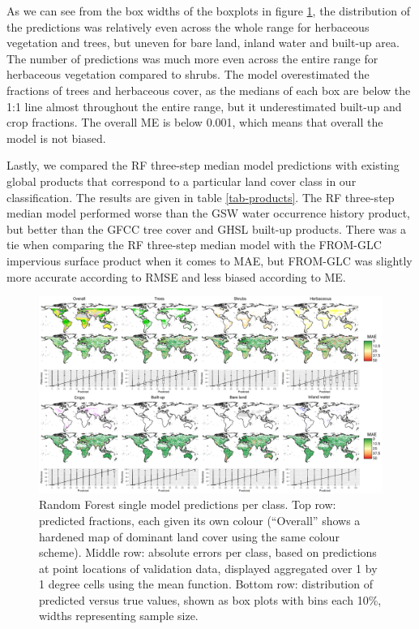 \documentclass[review,authoryear,3p]{elsarticle}
\begin{document}
As we can see from the box widths of the boxplots in figure \ref{fig-walltowall}, the distribution of the predictions was relatively even across the whole range for herbaceous vegetation and trees, but uneven for bare land, inland water and built-up area.
The number of predictions was much more even across the entire range for herbaceous vegetation compared to shrubs.
The model overestimated the fractions of trees and herbaceous cover, as the medians of each box are below the 1:1 line almost throughout the entire range, but it underestimated built-up and crop fractions.
The overall \gls{ME} is below 0.001, which means that overall the model is not biased.

Lastly, we compared the \gls{RF} three-step median model predictions with existing global products that correspond to a particular land cover class in our classification.
The results are given in table \ref{tab-products}.
The \gls{RF} three-step median model performed worse than the \gls{GSW} water occurrence history product, but better than the \gls{GFCC} tree cover and \gls{GHSL} built-up products.
There was a tie when comparing the \gls{RF} three-step median model with the \gls{FROM-GLC} impervious surface product when it comes to \gls{MAE}, but \gls{FROM-GLC} was slightly more accurate according to \gls{RMSE} and less biased according to \gls{ME}.

\begin{figure}
    \centering
    \includegraphics[width=\textwidth]{article-figures/maps/2020-10-12-walltowall.png}
    \caption{Random Forest single model predictions per class. Top row: predicted fractions, each given its own colour (``Overall'' shows a hardened map of dominant land cover using the same colour scheme). Middle row: absolute errors per class, based on predictions at point locations of validation data, displayed aggregated over 1 by 1 degree cells using the mean function. Bottom row: distribution of predicted versus true values, shown as box plots with bins each 10\%, widths representing sample size.}
    \label{fig-walltowall}
\end{figure}
\end{document}
